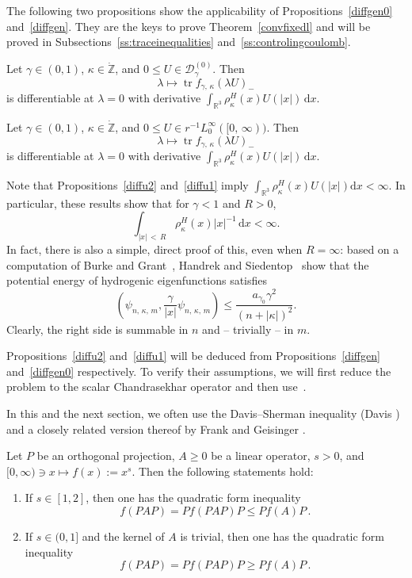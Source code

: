 \documentclass[AHL,Unicode,longabstracts,published]{cedram}
\DeclareMathOperator{\tr}{tr}
\newcommand*\dx{\mathrm{d}x}
\newcommand*\gz{\mathbb{Z}}
\newcommand*\rz{\mathbb{R}}
\newcommand*\zp{\dot{\gz}}
\newcommand*\cD{\mathcal{D}}
\begin{document}
The following two propositions show the applicability of Propositions~\ref{diffgen0} and~\ref{diffgen}. They are the keys to prove Theorem~\ref{convfixedl} and will be proved in Subsections~\ref{ss:traceinequalities} and~\ref{ss:controlingcoulomb}.

\begin{prop}\label{diffu2}
Let $\gamma\in(0,1)$, $\kappa\in\zp$, and $0\leq U\in\cD_\gamma^{(0)}$. Then
\[
\lambda\mapsto \tr f_{\gamma,\,\kappa}(\lambda U)_-
\]
is differentiable at $\lambda=0$ with derivative $\int_{\rz^3}\rho_\kappa^H(x) U(|x|)\,\dx$.
\end{prop}

\begin{prop}\label{diffu1}
Let $\gamma\in(0,1)$, $\kappa\in\zp$, and $0\leq U \in r^{-1} L^\infty_0 ([0,\,\infty))$. Then
\[
\lambda\mapsto
\tr f_{\gamma,\,\kappa}(\lambda U)_-
\]
is differentiable at $\lambda=0$ with derivative $\int_{\rz^3} \rho_\kappa^H(x) U(|x|)\,\dx$.
\end{prop}

Note that Propositions~\ref{diffu2} and~\ref{diffu1} imply $\int_{\rz^3}\rho_\kappa^H(x)U(|x|)\dx<\infty$. In particular, these results show that for $\gamma<1$ and $R>0$,
\[
\int_{|x|\,<\,R} \rho_\kappa^H(x) |x|^{-1}\,\dx < \infty.
\]
In fact, there is also a simple, direct proof of this, even when $R=\infty$: based on a computation of Burke and Grant~\cite{BurkeGrant1967}, Handrek and Siedentop~\cite[Lemma~2]{HandrekSiedentop2015} show that the potential energy of hydrogenic eigenfunctions satisfies
\[
\left(\psi_{n,\,\kappa,\,m},\frac{\gamma}{|x|}\psi_{n,\,\kappa,\,m}\right)
\leq\frac{a_{\gamma_0}\gamma^2}{(n+|\kappa|)^2}.
\]
Clearly, the right side is summable in $n$ and -- trivially -- in $m$.

Propositions~\ref{diffu2} and~\ref{diffu1} will be deduced from Propositions~\ref{diffgen} and~\ref{diffgen0} respectively. To verify their assumptions, we will first reduce the problem to the scalar Chandrasekhar operator and then use~\cite{Franketal2020P}.

In this and the next section, we often use the Davis--Sherman inequality (Davis \cite{Davis1957}) and a closely related version thereof by Frank and Geisinger \cite[Lem\-ma~6.4]{FrankGeisinger2016}.

\begin{lemm}
Let $P$ be an orthogonal projection, $A\geq0$ be a linear operator, $s>0$, and $[0,\infty)\ni x\mapsto f(x):=x^s$. Then the following statements hold:
\begin{enumerate}
\item If $s\in[1,2]$, then one has the quadratic form inequality
\begin{equation}\label{eq:SD}
f(PAP) = Pf(PAP)P \leq Pf(A)P\,.
\end{equation}

\item If $s\in(0,1]$ and the kernel of $A$ is trivial, then one has the quadratic form inequality
\begin{equation}\label{eq:FG}
f(PAP) = Pf(PAP)P \geq Pf(A)P\,.
\end{equation}
\end{enumerate}
\end{lemm}
\end{document}
